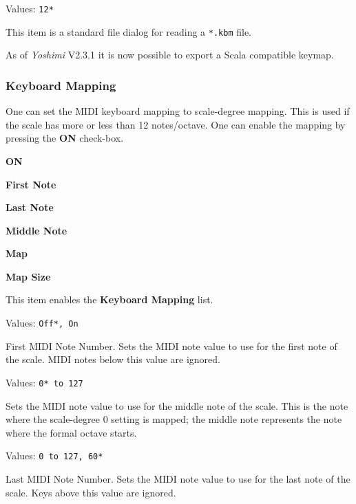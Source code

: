    Values: \texttt{12*}

   This item is a standard file dialog for reading
   a \texttt{*.kbm} file.

   As of \textsl{Yoshimi} V2.3.1 it is now possible to export a Scala compatible keymap.

\subsubsection{Keyboard Mapping}
\label{subsubsec:scales_keyboard_mapping}

   One can set the MIDI keyboard mapping to scale-degree mapping.
   This is used if the scale has more or less than 12 notes/octave.
   One can enable the mapping by pressing the \textbf{ON} check-box.

   \begin{enumber}
      \item \textbf{ON}
      \item \textbf{First Note}
      \item \textbf{Last Note}
      \item \textbf{Middle Note}
      \item \textbf{Map}
      \item \textbf{Map Size}
   \end{enumber}

   \setcounter{ItemCounter}{0}      %

   This item enables the \textbf{Keyboard Mapping} list.

   Values: \texttt{Off*, On}

   First MIDI Note Number.
   Sets the MIDI note value to use for the first note of the scale.
   MIDI notes below this value are ignored.

   Values: \texttt{0* to 127}

   Sets the MIDI note value to use for the middle note of the scale.
   This is the note where the scale-degree 0 setting is mapped;
   the middle note represents the note where the formal octave starts.

   Values: \texttt{0 to 127, 60*}

   Last MIDI Note Number.
   Sets the MIDI note value to use for the last note of the scale.
   Keys above this value are ignored.

